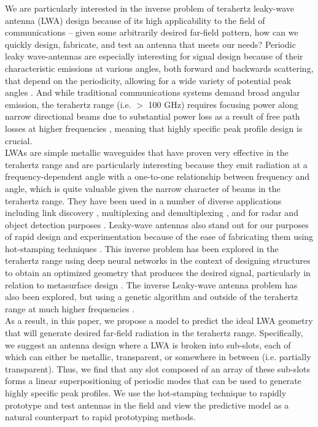 \documentclass[11pt]{article}
\begin{document}
\noindent We are particularly interested in the inverse problem of terahertz leaky-wave antenna (LWA) design because of its high applicability to the field of communications -- given some arbitrarily desired far-field pattern, how can we quickly design, fabricate, and test an antenna that meets our needs? Periodic leaky wave-antennas are especially interesting for signal design because of their characteristic emissions at various angles, both forward and backwards scattering, that depend on the periodicity, allowing for a wide variety of potential peak angles \cite{6556051}. And while traditional communications systems demand broad angular emission, the terahertz range (i.e. $>$ 100 GHz) requires focusing power along narrow directional beams due to substantial power loss as a result of free path losses at higher frequencies \cite{doi:10.1063/1.5014037, Ghasempour:2020tz}, meaning that highly specific peak profile design is crucial. \\

\noindent LWAs are simple metallic waveguides that have proven very effective in the terahertz range and are particularly interesting because they emit radiation at a frequency-dependent angle with a one-to-one relationship between frequency and angle, which is quite valuable given the narrow character of beams in the terahertz range. \cite{doi:10.1063/5.0033126} They have been used in a number of diverse applications including link discovery \cite{Ghasempour:2020tz}, multiplexing and demultiplexing \cite{Karl:2015uh, Ma:2017vo}, and for radar and object detection purposes \cite{Amarasinghe:20, Amarasinghe:21}. Leaky-wave antennas also stand out for our purposes of rapid design and experimentation because of the ease of fabricating them using hot-stamping techniques \cite{Guerboukha:21}. This inverse problem has been explored in the terahertz range using deep neural networks in the context of designing structures to obtain an optimized geometry that produces the desired signal, particularly in relation to metasurface design \cite{Deng:21, 9602997}. The inverse Leaky-wave antenna problem has also been explored, but using a genetic algorithm and outside of the terahertz range at much higher frequencies \cite{Jafar-Zanjani:2018vy}. \\

\noindent As a result, in this paper, we propose a model to predict the ideal LWA geometry that will generate desired far-field radiation in the terahertz range. Specifically, we suggest an antenna design where a LWA is broken into sub-slots, each of which can either be metallic, transparent, or somewhere in between (i.e. partially transparent). Thus, we find that any slot composed of an array of these sub-slots forms a linear superpositioning of periodic modes that can be used to generate highly specific peak profiles. We use the hot-stamping technique to rapidly prototype and test antennas in the field and view the predictive model as a natural counterpart to rapid prototyping methods.
\end{document}
